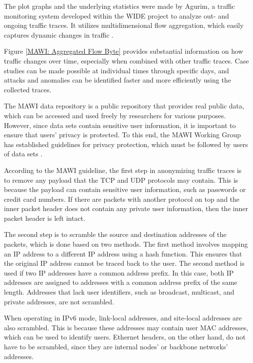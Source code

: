 \documentclass[sigconf,authorversion,nonacm]{acmart}
\begin{document}
The plot graphs and the underlying statistics were made by Agurim, a traffic monitoring system developed within the WIDE project to analyze out- and ongoing traffic traces. It utilizes multidimensional flow aggregation, which easily captures dynamic changes in traffic \cite{179442}. 

Figure \ref{MAWI: Aggregated Flow Byte} provides substantial information on how traffic changes over time, especially when combined with other traffic traces. Case studies can be made possible at individual times through specific days, and attacks and anomalies can be identified faster and more efficiently using the collected traces.

The MAWI data repository is a public repository that provides real public data, which can be accessed and used freely by researchers for various purposes. However, since data sets contain sensitive user information, it is important to ensure that users' privacy is protected. To this end, the MAWI Working Group has established guidelines for privacy protection, which must be followed by users of data sets \cite{MAWIGuideline}. 

According to the MAWI guideline, the first step in anonymizing traffic traces is to remove any payload that the TCP and UDP protocols may contain. This is because the payload can contain sensitive user information, such as passwords or credit card numbers. If there are packets with another protocol on top and the inner packet header does not contain any private user information, then the inner packet header is left intact.

The second step is to scramble the source and destination addresses of the packets, which is done based on two methods. The first method involves mapping an IP address to a different IP address using a hash function. This ensures that the original IP address cannot be traced back to the user. The second method is used if two IP addresses have a common address prefix. In this case, both IP addresses are assigned to addresses with a common address prefix of the same length. Addresses that lack user identifiers, such as broadcast, multicast, and private addresses, are not scrambled.

When operating in IPv6 mode, link-local addresses, and site-local addresses are also scrambled. This is because these addresses may contain user MAC addresses, which can be used to identify users. Ethernet headers, on the other hand, do not have to be scrambled, since they are internal nodes' or backbone networks' addresses. 
\end{document}
